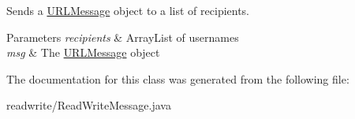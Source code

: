 Sends a \hyperlink{class_u_r_l_message}{U\+R\+L\+Message} object to a list of recipients. 


\begin{DoxyParams}{Parameters}
{\em recipients} & Array\+List of usernames \\
\hline
{\em msg} & The \hyperlink{class_u_r_l_message}{U\+R\+L\+Message} object \\
\hline
\end{DoxyParams}


The documentation for this class was generated from the following file\+:\begin{DoxyCompactItemize}
\item 
readwrite/Read\+Write\+Message.\+java\end{DoxyCompactItemize}
